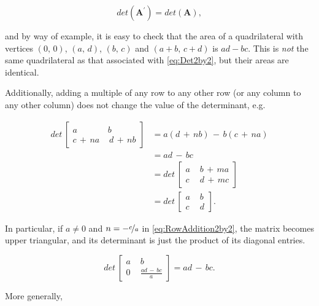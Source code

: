 \documentclass[graybox,envcountchap,sectrefs]{svmono}\usepackage[]{graphicx}\usepackage[]{xcolor}
\begin{document}
\begin{appendices}
\begin{equation}
det\left(\mathrm{\mathbf{A}^{\prime}}\right)=det\left(\mathrm{\mathbf{A}}\right),\label{eq:DeterminantofTranspose}
\end{equation}

and by way of example, it is easy to check that the area of a quadrilateral
with vertices $(0,\,0)$, $(a,\,d)$, $(b,\,c)$ and $(a+b,\,c+d)$
is $ad-bc$. This is \emph{not} the same quadrilateral as that associated
with \eqref{eq:Det2by2}, but their areas are identical.

Additionally, adding a multiple of any row to any other row (or any
column to any other column) does not change the value of the determinant,
e.g.

\begin{align}
det\,\left[\begin{array}{cc}
\mathit{a} & \mathit{b}\\
\mathit{c}\,+\,na\, & \,\mathit{d\,+\,nb}
\end{array}\right] & =a\left(d\,+\,nb\right)\,-\,b\left(c\,+\,na\right)\nonumber \\[0.5em]
 & =ad\,-\,bc\nonumber \\[0.5em]
 & =det\,\left[\begin{array}{cc}
\mathit{a}\, & \,\mathit{b}\,+\,ma\\
\mathit{c}\, & \,\mathit{d\,+\,mc}
\end{array}\right]\nonumber \\[0.5em]
 & =det\mathrm{\,\left[\begin{array}{cc}
\mathit{a}\, & \,\mathit{b}\\
\mathit{c}\, & \,\mathit{d}
\end{array}\right]}.\label{eq:RowAddition2by2}
\end{align}

In particular, if $a\ne0$ and $n=-\nicefrac{c}{a}$ in \eqref{eq:RowAddition2by2},
the matrix becomes upper triangular, and its determinant is just the
product of its diagonal entries. 

\begin{equation}
det\mathrm{\,\left[\begin{array}{cl}
\mathit{a}\, & \,\mathit{b}\\
0\, & \,\mathit{\frac{ad\,-\,bc}{a}}
\end{array}\right]}=ad\,-\,bc.\label{eq:Det2by2Triangular}
\end{equation}

More generally, 


\end{appendices}
\end{document}
